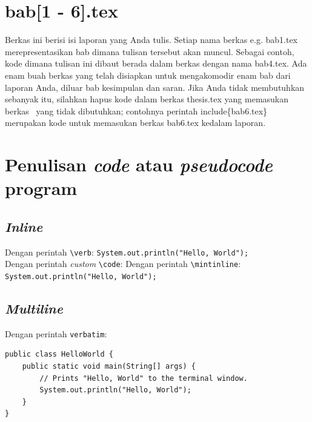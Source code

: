     \section{bab[1 - 6].tex}
    Berkas ini berisi isi laporan yang Anda tulis.
    Setiap nama berkas e.g. bab1.tex merepresentasikan bab dimana tulisan tersebut
    akan muncul.
    Sebagai contoh, kode dimana tulisan ini dibaut berada dalam berkas dengan nama
    bab4.tex.
    Ada enam buah berkas yang telah disiapkan untuk mengakomodir enam bab dari
    laporan Anda, diluar bab kesimpulan dan saran.
    Jika Anda tidak membutuhkan sebanyak itu, silahkan hapus kode dalam berkas
    thesis.tex yang memasukan berkas \latex~yang tidak dibutuhkan;  contohnya
    perintah \bslash include\{bab6.tex\} merupakan kode untuk memasukan berkas
    bab6.tex kedalam laporan.

    \section{Penulisan \textit{code} atau \textit{pseudocode} program}

    \subsection{\textit{Inline}}

    Dengan perintah \verb|\verb|: \verb|System.out.println("Hello, World");| \\
    Dengan perintah \textit{custom} \verb|\code|: 
    Dengan perintah \verb|\mintinline|: \texttt{System.out.println("Hello, World"); }

    \subsection{\textit{Multiline}}

    Dengan perintah \verb|verbatim|:

    \begin{verbatim}	
public class HelloWorld {
    public static void main(String[] args) {
        // Prints "Hello, World" to the terminal window.
        System.out.println("Hello, World");
    }
}
\end{verbatim}

